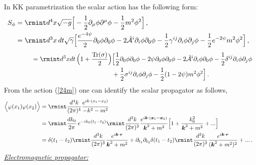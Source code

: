  In KK parametrization the scalar action has the following form:
 \begin{align}
    \begin{split}
        S_{\phi}&=\rmint d^4x \sqrt{-g}\Big[-\frac{1}{2}\partial_{\mu}\phi\partial^{\mu}\phi-\frac{1}{2}m^2 \phi^2\Big]\,,\\ &
        =\rmint d^3x \,dt \sqrt{\gamma}\Big[\frac{e^{-4\psi}}{2}\partial_{0}\phi\partial_{0}\phi-2\Hat{\mathcal{A}}^{i}\partial_{i}\phi\partial_{0}\phi-\frac{1}{2}\gamma^{ij}\partial_{i}\phi\partial_{j}\phi-\frac{1}{2}e^{-2\psi}m^2\phi^2 \nonumber
        \Big] \,,\end{split}
\end{align}
\begin{align}
    \begin{split}
\,\,\,\,\,\,\,\,\,\,\,\,\,\,\,\,\,\,\,\,\,\,\,\,\,\,\,=\rmint d^3x dt \,\Big(1+\frac{\text{Tr}(\sigma)}{2}\Big)&\Big[\frac{1}{2}\partial_{0}\phi\partial_{0}\phi-2\psi \partial_{0}\phi\partial_{0}\phi-2\Hat{\mathcal{A}}^{i}\partial_{i}\phi\partial_{0}\phi-\frac{1}{2}\delta^{ij}\partial_{i}\phi\partial_{j}\phi \\&+ \frac{1}{2}\sigma^{ij}\partial_{i}\phi\partial_{j}\phi-\frac{1}{2}(1-2\psi)m^2\phi^2\Big]\,.\label{24m}
    \end{split}
\end{align}
From the action (\ref{24m}) one can identify the scalar propagator as follows,
 \begin{align}
    \begin{split}
\Big\langle\varphi(x_1)\varphi(x_2)\Big\rangle &=\rmint \frac{d^4 k}{(2\pi)^4} \frac{e^{ik\cdot(x_1-x_2)}}{-k^2-m^2}\\&=\rmint \frac{dk_0}{2\pi}\,e^{-ik_0 (t_1-t_2)}\rmint \frac{d^3k}{(2\pi)^3}\frac{e^{i\boldsymbol{k}\cdot(\boldsymbol{x}_1-\boldsymbol{x}_2)}}{\boldsymbol{k}^2+m^2}\Big[1+\frac{k_0^2}{\boldsymbol{k}^2+m^2}+...\Big]
        \\ &
        =\delta(t_1-t_2)\rmint \frac{d^3k}{(2\pi)^3}\frac{e^{i\boldsymbol{k}\cdot\boldsymbol{r}}}{\boldsymbol{k}^2+m^2}+\partial_{t_1}\partial_{t_2}\delta(t_1-t_2)\rmint \frac{d^3k}{(2\pi)^3}\frac{e^{i\boldsymbol{k}\cdot\boldsymbol{r}}}{(\boldsymbol{k}^2+m^2)^2}+...\,. 
    \end{split}
\end{align}
\underline{\textit{ Electromagnetic propagator:}}

